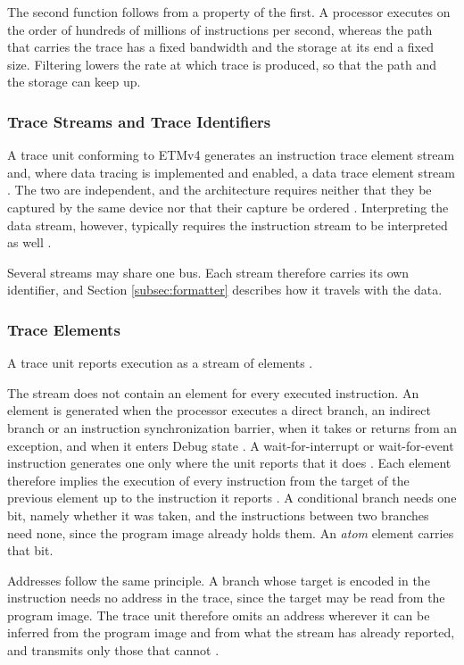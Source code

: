 The second function follows from a property of the first. A processor executes on the order of hundreds of millions of instructions per second, whereas the path that carries the trace has a fixed bandwidth and the storage at its end a fixed size. Filtering lowers the rate at which trace is produced, so that the path and the storage can keep up.

\subsubsection{Trace Streams and Trace Identifiers}
A trace unit conforming to ETMv4 generates an instruction trace element stream and, where data tracing is implemented and enabled, a data trace element stream \cite{etmv4_spec}. The two are independent, and the architecture requires neither that they be captured by the same device nor that their capture be ordered \cite{etmv4_spec}. Interpreting the data stream, however, typically requires the instruction stream to be interpreted as well \cite{etmv4_spec}.

Several streams may share one bus. Each stream therefore carries its own identifier, and Section \ref{subsec:formatter} describes how it travels with the data.

\subsubsection{Trace Elements}
\label{subsec:elements}
A trace unit reports execution as a stream of elements \cite{etmv4_spec}.

The stream does not contain an element for every executed instruction. An element is generated when the processor executes a direct branch, an indirect branch or an instruction synchronization barrier, when it takes or returns from an exception, and when it enters Debug state \cite{etmv4_spec}. A wait-for-interrupt or wait-for-event instruction generates one only where the unit reports that it does \cite{etmv4_spec}. Each element therefore implies the execution of every instruction from the target of the previous element up to the instruction it reports \cite{etmv4_spec}. A conditional branch needs one bit, namely whether it was taken, and the instructions between two branches need none, since the program image already holds them. An \textit{atom} element carries that bit.

Addresses follow the same principle. A branch whose target is encoded in the instruction needs no address in the trace, since the target may be read from the program image. The trace unit therefore omits an address wherever it can be inferred from the program image and from what the stream has already reported, and transmits only those that cannot \cite{etmv4_spec}.


